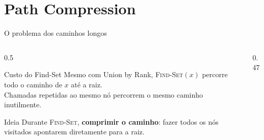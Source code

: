 \documentclass[aspectratio=169]{beamer}
\begin{document}
\section{Path Compression}

\begin{frame}[shrink=10]{O problema dos caminhos longos}%
  \begin{columns}[T]
    \begin{column}{0.5\textwidth}
      \begin{alertblock}{Custo do Find-Set}
        Mesmo com Union by Rank, \textsc{Find-Set}$(x)$ percorre todo o caminho de $x$ até a raiz.\\[4pt]
        Chamadas repetidas ao mesmo nó percorrem o mesmo caminho inutilmente.
      \end{alertblock}
      \vspace{0.3cm}
      \begin{block}{Ideia}
        Durante \textsc{Find-Set}, \textbf{comprimir o caminho}: fazer todos os nós visitados apontarem diretamente para a raiz.
      \end{block}
    \end{column}
    \begin{column}{0.47\textwidth}
    \end{column}
  \end{columns}
\end{frame}
\end{document}
